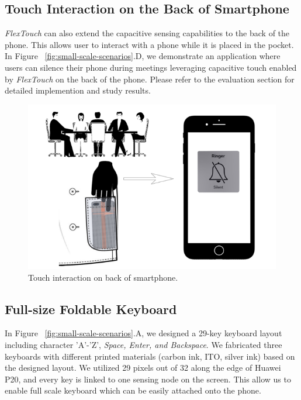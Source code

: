\subsection{Touch Interaction on the Back of Smartphone}
\textit{FlexTouch} can also extend the capacitive sensing capabilities to the back of the phone. This allows user to interact with a phone while it is placed in the pocket. In Figure ~\ref{fig:small-scale-scenarios}.D, we demonstrate an application where users can silence their phone during meetings leveraging capacitive touch enabled by \textit{FlexTouch} on the back of the phone. Please refer to the evaluation section for detailed implemention and study results. 

\begin{figure}[ht]
  \centering
    \includegraphics[width=0.95\columnwidth]{figures/backtouch.png}
    \setlength{\belowcaptionskip}{-6pt}
    \caption{Touch interaction on back of smartphone.}
    \label{fig:backtouch}
  \end{figure}

\subsection{Full-size Foldable Keyboard}
In Figure ~\ref{fig:small-scale-scenarios}.A, we designed a 29-key keyboard layout including character 'A'-'Z', \textit{Space, Enter, \emph{and} Backspace}. We fabricated three keyboards with different printed materials (carbon ink, ITO, silver ink) based on the designed layout. We utilized 29 pixels out of 32 along the edge of Huawei P20, and every key is linked to one sensing node on the screen. This allow us to enable full scale keyboard which can be easily attached onto the phone.

